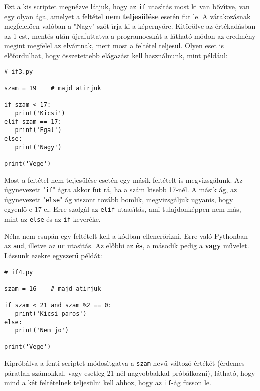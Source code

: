 \documentclass[12pt]{article}
\begin{document}
Ezt a kis scriptet megn\'ezve l\'atjuk, hogy az {\tt if} utas\'{\i}t\'as most ki van b\H{o}v\'{\i}tve, van egy 
olyan \'aga, amelyet a felt\'etel {\bf nem teljes\"ul\'ese} eset\'en fut le. A v\'arakoz\'asnak megfelel\H{o}en 
val\'oban a "Nagy" sz\'ot \'{\i}rja ki a k\'eperny\H{o}re. Kit\"or\"olve az \'ert\'ekad\'asban az 1-est, ment\'es 
ut\'an \'ujrafuttatva a programocsk\'at a l\'athat\'o m\'odon az eredm\'eny megint megfelel az elv\'artnak, mert 
most a felt\'etel teljes\"ul. Olyen eset is el\H{o}fordulhat, hogy \"osszetettebb el\'agaz\'ast kell haszn\'alnunk, 
mint p\'eld\'aul:

\begin{Verbatim}[fontsize=\small]
# if3.py

szam = 19    # majd atirjuk

if szam < 17:
   print('Kicsi')
elif szam == 17:
   print('Egal')
else:
   print('Nagy')

print('Vege')
\end{Verbatim}

Most a felt\'etel nem teljes\"ul\'ese eset\'en egy m\'asik felt\'etelt is megvizsg\'alunk. Az \'ugynevezett "{\tt if}" 
\'agra akkor fut r\'a, ha a sz\'am kisebb 17-n\'el. A m\'asik \'ag, az \'ugynevezett "{\tt else}" \'ag viszont 
tov\'abb bomlik, megvizsg\'aljuk ugyanis, hogy egyenl\H{o}-e 17-el. Erre szolg\'al az {\tt elif} utaas\'{\i}t\'as, 
ami tulajdonk\'eppen nem m\'as, mint az {\tt else} \'es az {\tt if} kever\'eke. 


N\'eha nem csup\'an egy felt\'etelt kell a k\'odban ellener\H{o}rizni. Erre val\'o Pythonban az {\tt and}, illetve az 
{\tt or} utas\'{\i}t\'as. Az el\H{o}bbi az {\bf \'es}, a m\'asodik pedig a {\bf vagy} m\H{u}velet. L\'assunk ezekre 
egyszer\H{u} p\'eld\'at:

\begin{Verbatim}[fontsize=\small]
# if4.py

szam = 16    # majd atirjuk

if szam < 21 and szam %2 == 0:
   print('Kicsi paros')
else:
   print('Nem jo')

print('Vege')
\end{Verbatim}

Kipr\'ob\'alva a fenti scriptet m\'odos\'{\i}tgatva a {\tt szam} nev\H{u} v\'altoz\'o \'ert\'ek\'et (\'erdemes 
p\'aratlan sz\'amokkal, vagy esetleg 21-n\'el nagyobbakkal pr\'ob\'alkozni), l\'athat\'o, hogy mind a k\'et 
felt\'etelnek teljes\"ulni kell ahhoz, hogy az {\tt if}-\'ag fusson le. 
\end{document}
